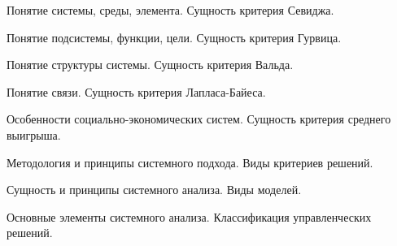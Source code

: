 \documentclass[
	14pt,
	a4paper,
	]
	{scrartcl}
\begin{document}
\shapk
{}
\setcounter{zad}{0}

\vfill
\z Понятие системы, среды, элемента.
 \vfill
\z Сущность критерия Севиджа. \vfill

\vfill

\newpage


\shapk
{}
\setcounter{zad}{0}

\vfill
\z Понятие подсистемы, функции, цели.
 \vfill
\z Сущность критерия Гурвица.
 \vfill

\vfill

\newpage


\shapk
{}
\setcounter{zad}{0}

\vfill
\z Понятие структуры системы.
 \vfill
\z Сущность критерия Вальда.
 \vfill

\vfill

\newpage


\shapk
{}
\setcounter{zad}{0}

\vfill
\z Понятие связи.
 \vfill
\z Сущность критерия Лапласа-Байеса.
 \vfill

\vfill

\newpage


\shapk
{}
\setcounter{zad}{0}

\vfill
\z Особенности социально-экономических систем.
 \vfill
\z Сущность критерия среднего выигрыша.
 \vfill

\vfill

\newpage


\shapk
{}
\setcounter{zad}{0}

\vfill
\z Методология и принципы системного подхода.
 \vfill
\z Виды критериев решений.
 \vfill

\vfill

\newpage


\shapk
{}
\setcounter{zad}{0}

\vfill
\z Сущность и принципы системного анализа.
 \vfill
\z Виды моделей.
 \vfill

\vfill

\newpage


\shapk
{}
\setcounter{zad}{0}

\vfill
\z Основные элементы системного анализа.
 \vfill
\z Классификация управленческих решений.
 \vfill

\vfill

\newpage
\end{document}
